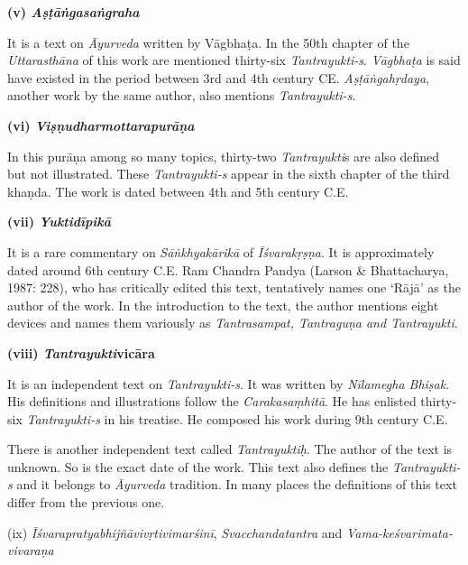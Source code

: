 \vskip 2pt

\textbf{(v) \textit{Aṣṭāṅgasaṅgraha}}

It is a text on \textit{Āyurveda} written by Vāgbhaṭa. In the 50th chapter of the \textit{Uttarasthāna} of this work are mentioned thirty-six \textit{Tantrayukti-s}. \textit{Vāgbhaṭa} is said have existed in the period between 3rd and 4th century CE. \textit{Aṣṭāṅgahṛdaya}, another work by the same author, also mentions \textit{Tantrayukti-s}.

\vskip 2pt

\textbf{(vi) \textit{Viṣṇudharmottarapurāṇa}}

In this purāṇa among so many topics, thirty-two \textit{Tantrayukti}s are also defined but not illustrated. These \textit{Tantrayukti-s} appear in the sixth chapter of the third khaṇda. The work is dated between 4th and 5th century C.E.

\vskip 2pt

\textbf{(vii) \textit{Yuktidīpikā}}

It is a rare commentary on \textit{Sāṅkhyakārikā} of \textit{Īśvarakṛṣṇa}. It is approximately dated around 6th century C.E. Ram Chandra Pandya (Larson \& Bhattacharya, 1987: 228), who has critically edited this text, tentatively names one ‘Rājā’ as the author of the work. In the introduction to the text, the author mentions eight devices and names them variously as \textit{Tantrasampat, Tantraguṇa and Tantrayukti}.

\vskip 2pt

\textbf{(viii) \textit{Tantrayukti}vicāra}

It is an independent text on \textit{Tantrayukti-s}. It was written by \textit{Nīlamegha Bhiṣak}. His definitions and illustrations follow the \textit{Carakasaṃhitā}. He has enlisted thirty-six \textit{Tantrayukti-s} in his treatise. He composed his work during 9th century C.E.

There is another independent text called \textit{Tantrayuktiḥ}. The author of the text is unknown. So is the exact date of the work. This text also defines the \textit{Tantrayukti-s} and it belongs to \textit{Āyurveda} tradition. In many places the definitions of this text differ from the previous one. 

\vskip 2pt

(ix) \textit{Īśvarapratyabhijñāvivṛtivimarśinī}, \textit{Svacchandatantra} and \textit{Vama-keśva\-rimata-vivaraṇa}

